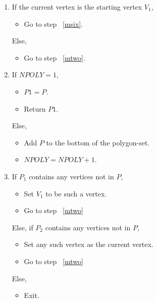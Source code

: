 \begin{enumerate}
		\item
		\label{mfive}
		If the current vertex is the starting vertex $V_{1}$, 
			\begin{itemize}
			\item
			Go to step ~\ref{msix}.
			\end{itemize}
		Else, 
			\begin{itemize}
			\item
			Go to step ~\ref{mtwo}.
			\end{itemize}
		\item
		\label{msix}
		If $NPOLY = 1$, 
			\begin{itemize}
			\item
			$P1 = P$.
			\item
			Return $P1$.
			\end{itemize}
		Else,
			\begin{itemize}
			\item
 			Add $P$ to the bottom of the polygon-set.
			\item
			$NPOLY = NPOLY + 1$.
			\end{itemize}
		\item
		\label{mseven}
		If $P_{1}$ contains any vertices not in $P$,
			\begin{itemize}
			\item
			Set $V_{1}$ to be such a vertex.
			\item
			Go to step ~\ref{mtwo}
			\end{itemize}
		Else, if $P_{2}$ contains any vertices not in $P$,
			\begin{itemize}
			\item
			Set any such vertex as the current vertex.
			\item
			Go to step ~\ref{mtwo}
			\end{itemize}
		Else,
			\begin{itemize}
			\item
			Exit.
			\end{itemize}
		\end{enumerate}

